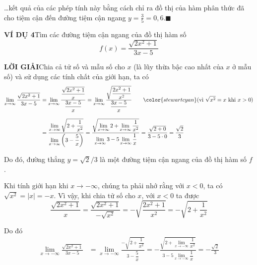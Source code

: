 \begin{minipage}[t]{0.71\textwidth}
    \vspace*{0pt}
    \noindent\dots kết quả của các phép tính này bằng cách chỉ ra đồ thị của hàm phân thức đã cho tiệm cận đến đường tiệm cận ngang $y = \frac{3}{5} = 0{,}6$.\hfill{\color{stewartcyan}$\blacksquare$}

    \vspace{1em}
    \noindent\textbf{\textsf{\color{stewartcyan}VÍ DỤ 4}}\hspace{1em}Tìm các đường tiệm cận ngang của đồ thị hàm số
    \[
    f(x) = \frac{\sqrt{2x^2 + 1}}{3x - 5}
    \]

    \noindent\textbf{\textsf{\color{stewartcyan}LỜI GIẢI}}\hspace{1em}Chia cả tử số và mẫu số cho $x$ (là lũy thừa bậc cao nhất của $x$ ở mẫu số) và sử dụng các tính chất của giới hạn, ta có
    \begin{align*}
    \lim_{x \to \infty} \frac{\sqrt{2x^2 + 1}}{3x - 5}
    &= \lim_{x \to \infty} \frac{\dfrac{\sqrt{2x^2 + 1}}{x}}{\dfrac{3x - 5}{x}}
    = \lim_{x \to \infty} \frac{\sqrt{\dfrac{2x^2 + 1}{x^2}}}{\dfrac{3x - 5}{x}}
    \qquad {\color{stewartcyan}(\text{vì } \sqrt{x^2} = x \text{ khi } x > 0)}\\[8pt]
    &= \frac{\lim\limits_{x \to \infty} \sqrt{2 + \dfrac{1}{x^2}}}{\lim\limits_{x \to \infty} \left(3 - \dfrac{5}{x}\right)}
    = \frac{\sqrt{\lim\limits_{x \to \infty} 2 + \lim\limits_{x \to \infty} \dfrac{1}{x^2}}}{\lim\limits_{x \to \infty} 3 - 5 \lim\limits_{x \to \infty} \dfrac{1}{x}}
    = \frac{\sqrt{2 + 0}}{3 - 5 \cdot 0} = \frac{\sqrt{2}}{3}
    \end{align*}

    \noindent Do đó, đường thẳng $y = \sqrt{2}/3$ là một đường tiệm cận ngang của đồ thị hàm số $f$.

    Khi tính giới hạn khi $x \to -\infty$, chúng ta phải nhớ rằng với $x < 0$, ta có $\sqrt{x^2} = |x| = -x$. Vì vậy, khi chia tử số cho $x$, với $x < 0$ ta được
    \[
    \frac{\sqrt{2x^2 + 1}}{x} = \frac{\sqrt{2x^2 + 1}}{-\sqrt{x^2}} = -\sqrt{\frac{2x^2 + 1}{x^2}} = -\sqrt{2 + \frac{1}{x^2}}
    \]

    \noindent Do đó
    \begin{align*}
    \lim_{x \to -\infty} \frac{\sqrt{2x^2 + 1}}{3x - 5}
    &= \lim_{x \to -\infty} \frac{-\sqrt{2 + \dfrac{1}{x^2}}}{3 - \dfrac{5}{x}}
    = -\frac{\sqrt{2 + \lim\limits_{x \to -\infty} \dfrac{1}{x^2}}}{3 - 5 \lim\limits_{x \to -\infty} \dfrac{1}{x}}
    = -\frac{\sqrt{2}}{3}
    \end{align*}


\end{minipage}
